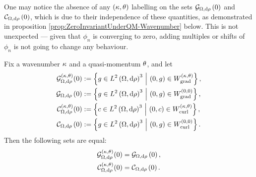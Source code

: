 One may notice the absence of any $\left( \kappa, \theta \right)$ labelling on the sets $\mathcal{G}_{ \Omega, \mathrm{d}\rho}\left( 0 \right)$ and $\mathcal{C}_{ \Omega, \mathrm{d}\rho}\left( 0 \right)$, which is due to their independence of these quantities, as demonstrated in proposition \ref{prop:ZeroInvariantUnderQM-Wavenumber} below.
This is not unexpected --- given that $\phi_n$ is converging to zero, adding multiples or shifts of $\phi_n$ is not going to change any behaviour.
\begin{prop} \label{prop:ZeroInvariantUnderQM-Wavenumber}
	Fix a wavenumber $\kappa$ and a quasi-momentum $\theta$, and let
	\begin{align*}
		\mathcal{G}_{\Omega,\mathrm{d}\rho}^{\left( \kappa, \theta \right)}(0) &:= \left\{  g\in L^{2}\left( \Omega,\mathrm{d} \rho \right)^3 \ \middle\vert \  \left( 0,g \right)\in W^{\left( \kappa, \theta \right)}_\mathrm{grad}  \right\}, \\
		\mathcal{G}_{ \Omega, \mathrm{d}\rho}\left( 0 \right) &:= \left\{  g\in L^{2}\left( \Omega,\mathrm{d} \rho \right)^3 \ \middle\vert \  \left( 0,g \right)\in W^{\left( 0, 0 \right)}_\mathrm{grad}  \right\}, \\
		\mathcal{C}_{\Omega,\mathrm{d}\rho}^{\left( \kappa, \theta \right)}(0) &:= \left\{  c\in L^{2}\left( \Omega,\mathrm{d} \rho \right)^3 \ \middle\vert \  \left( 0,c \right)\in W^{\left( \kappa, \theta \right)}_\mathrm{curl}  \right\}, \\
		\mathcal{C}_{ \Omega, \mathrm{d}\rho}\left( 0 \right) &:= \left\{  g\in L^{2}\left( \Omega,\mathrm{d} \rho \right)^3 \ \middle\vert \  \left( 0,g \right)\in W^{\left( 0, 0 \right)}_\mathrm{curl}  \right\}.
	\end{align*}
	Then the following sets are equal:
	\begin{align*}
		\mathcal{G}_{\Omega,\mathrm{d}\rho}^{\left( \kappa, \theta \right)}(0) &= \mathcal{G}_{ \Omega, \mathrm{d}\rho}\left( 0 \right), \\
		\mathcal{C}_{\Omega,\mathrm{d}\rho}^{\left( \kappa, \theta \right)}(0) &= \mathcal{C}_{ \Omega, \mathrm{d}\rho}\left( 0 \right).
	\end{align*}
\end{prop}
